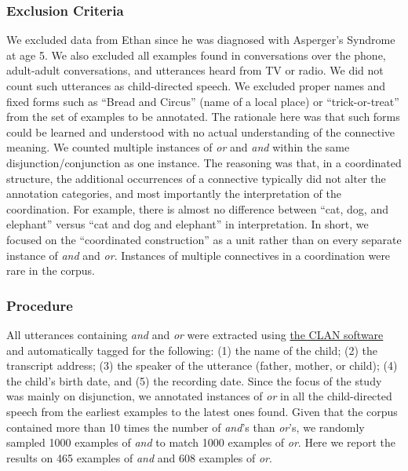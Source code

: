 \documentclass[floatsintext,man]{apa6}
\theoremstyle{definition}
\theoremstyle{definition}
\theoremstyle{definition}
\theoremstyle{remark}
\begin{document}
\subsubsection{Exclusion Criteria}\label{exclusion-criteria-1}

We excluded data from Ethan since he was diagnosed with Asperger's
Syndrome at age 5. We also excluded all examples found in conversations
over the phone, adult-adult conversations, and utterances heard from TV
or radio. We did not count such utterances as child-directed speech. We
excluded proper names and fixed forms such as \enquote{Bread and Circus}
(name of a local place) or \enquote{trick-or-treat} from the set of
examples to be annotated. The rationale here was that such forms could
be learned and understood with no actual understanding of the connective
meaning. We counted multiple instances of \emph{or} and \emph{and}
within the same disjunction/conjunction as one instance. The reasoning
was that, in a coordinated structure, the additional occurrences of a
connective typically did not alter the annotation categories, and most
importantly the interpretation of the coordination. For example, there
is almost no difference between \enquote{cat, dog, and elephant} versus
\enquote{cat and dog and elephant} in interpretation. In short, we
focused on the \enquote{coordinated construction} as a unit rather than
on every separate instance of \emph{and} and \emph{or}. Instances of
multiple connectives in a coordination were rare in the corpus.

\subsubsection{Procedure}\label{procedure-1}

All utterances containing \emph{and} and \emph{or} were extracted using
\href{http://alpha.talkbank.org/clan/}{the CLAN software} and
automatically tagged for the following: (1) the name of the child; (2)
the transcript address; (3) the speaker of the utterance (father,
mother, or child); (4) the child's birth date, and (5) the recording
date. Since the focus of the study was mainly on disjunction, we
annotated instances of \emph{or} in all the child-directed speech from
the earliest examples to the latest ones found. Given that the corpus
contained more than 10 times the number of \emph{and}'s than
\emph{or}'s, we randomly sampled 1000 examples of \emph{and} to match
1000 examples of \emph{or}. Here we report the results on 465 examples
of \emph{and} and 608 examples of \emph{or}.
\end{document}
